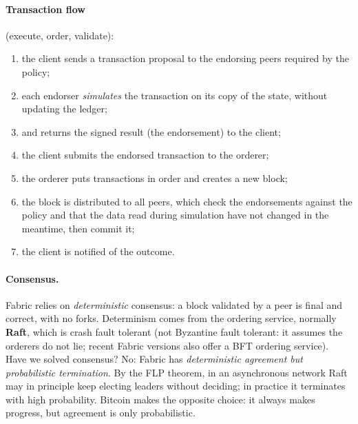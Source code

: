 \paragraph{Transaction flow} (execute, order, validate):
\begin{enumerate}
    \item the client sends a transaction proposal to the endorsing peers required by the policy;
    \item each endorser \emph{simulates} the transaction on its copy of the state, without updating the ledger;
    \item and returns the signed result (the endorsement) to the client;
    \item the client submits the endorsed transaction to the orderer;
    \item the orderer puts transactions in order and creates a new block;
    \item the block is distributed to all peers, which check the endorsements against the policy and that the data read during simulation have not changed in the meantime, then commit it;
    \item the client is notified of the outcome.
\end{enumerate}

\paragraph{Consensus.} Fabric relies on \emph{deterministic} consensus: a block validated by a peer is final and correct, with no forks. Determinism comes from the ordering service, normally \textbf{Raft}, which is crash fault tolerant (not Byzantine fault tolerant: it assumes the orderers do not lie; recent Fabric versions also offer a BFT ordering service). Have we solved consensus? No: Fabric has \emph{deterministic agreement but probabilistic termination}. By the FLP theorem, in an asynchronous network Raft may in principle keep electing leaders without deciding; in practice it terminates with high probability. Bitcoin makes the opposite choice: it always makes progress, but agreement is only probabilistic.

